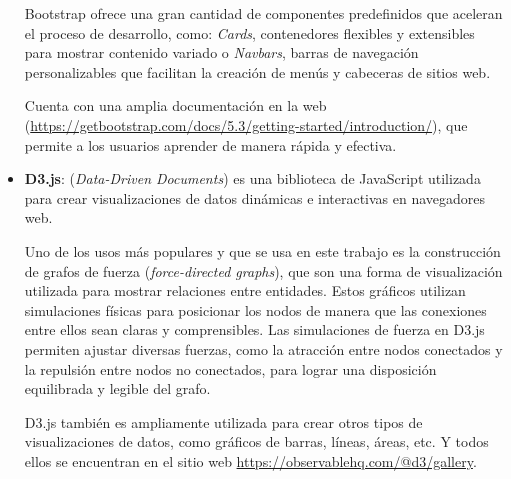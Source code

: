 \begin{itemize}
	Bootstrap ofrece una gran cantidad de componentes predefinidos que aceleran el proceso de desarrollo, como: \textit{Cards}, contenedores flexibles y extensibles para mostrar contenido variado o \textit{Navbars}, barras de navegación personalizables que facilitan la creación de menús y cabeceras de sitios web.
	
	Cuenta con una amplia documentación en la web (\url{https://getbootstrap.com/docs/5.3/getting-started/introduction/}), que permite a los usuarios aprender de manera rápida y efectiva.
	\item \textbf{D3.js}: (\textit{Data-Driven Documents}) es una biblioteca de JavaScript utilizada para crear visualizaciones de datos dinámicas e interactivas en navegadores web.
	
	Uno de los usos más populares y que se usa en este trabajo es la construcción de grafos de fuerza (\textit{force-directed graphs}), que son una forma de visualización utilizada para mostrar relaciones entre entidades. Estos gráficos utilizan simulaciones físicas para posicionar los nodos de manera que las conexiones entre ellos sean claras y comprensibles. Las simulaciones de fuerza en D3.js permiten ajustar diversas fuerzas, como la atracción entre nodos conectados y la repulsión entre nodos no conectados, para lograr una disposición equilibrada y legible del grafo.
	
	D3.js también es ampliamente utilizada para crear otros tipos de visualizaciones de datos, como gráficos de barras, líneas, áreas, etc. Y todos ellos se encuentran en el sitio web \url{https://observablehq.com/@d3/gallery}.
\end{itemize}
